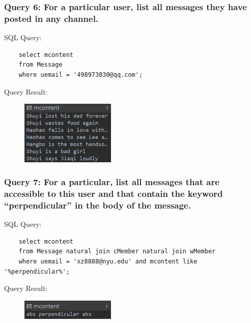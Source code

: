 \subsubsection{Query 6: For a particular user, list all messages they have posted in any channel.}
SQL Query:
\begin{verbatim}
    select mcontent
    from Message
    where uemail = '498973030@qq.com';
\end{verbatim}

Query Result:
\begin{figure}[ht!]
    \centering
    \includegraphics[width=0.4\textwidth]{img/sql6.JPG}
\end{figure}

\subsubsection{Query 7: For a particular, list all messages that are accessible to this user and that contain the keyword “perpendicular” in the
body of the message.}
SQL Query:
\begin{verbatim}
    select mcontent
    from Message natural join cMember natural join wMember
    where uemail = 'xz8888@nyu.edu' and mcontent like '%perpendicular%';
\end{verbatim}

Query Result:
\begin{figure}[ht!]
    \centering
    \includegraphics[width=0.4\textwidth]{img/sql7.JPG}
\end{figure}
